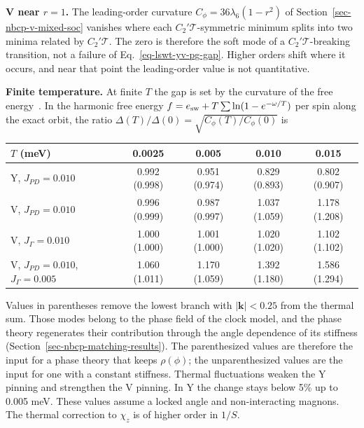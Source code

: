 \textbf{V near \(r=1\).} The leading-order curvature
\(C_\phi=36\lambda_6(1-r^2)\) of Section~\ref{sec-nbcp-v-mixed-soc}
vanishes where each \(C_2'\mathcal T\)-symmetric minimum splits into two
minima related by \(C_2'\mathcal T\). The zero is therefore the soft mode
of a \(C_2'\mathcal T\)-breaking transition, not a failure of
Eq.~\eqref{eq-lswt-yv-pg-gap}. Higher orders shift where it occurs, and
near that point the leading-order value is not quantitative.

\textbf{Finite temperature.} At finite \(T\) the gap is set by the
curvature of the free energy~\cite{lin2025}. In the harmonic free energy
\(f=e_{\rm sw}+T\sum\ln(1-e^{-\omega/T})\) per spin along the exact
orbit, the ratio \(\Delta(T)/\Delta(0)=\sqrt{C_\phi(T)/C_\phi(0)}\) is
\begin{center}
\small
\begin{tabular}{@{}lcccc@{}}
\toprule
\(T\) (meV) & 0.0025 & 0.005 & 0.010 & 0.015\\
\midrule
Y, \(J_{PD}=0.010\) & 0.992 (0.998) & 0.951 (0.974) & 0.829 (0.893) & 0.802 (0.907)\\
V, \(J_{PD}=0.010\) & 0.996 (0.999) & 0.987 (0.997) & 1.037 (1.059) & 1.178 (1.208)\\
V, \(J_\Gamma=0.010\) & 1.000 (1.000) & 1.001 (1.000) & 1.020 (1.020) & 1.102 (1.102)\\
V, \(J_{PD}=0.010\), \(J_\Gamma=0.005\) & 1.060 (1.011) & 1.170 (1.059) & 1.392 (1.180) & 1.586 (1.294)\\
\bottomrule
\end{tabular}
\end{center}
Values in parentheses remove the lowest branch with
\(|\mathbf k|<0.25\) from the thermal sum. Those modes belong to the
phase field of the clock model, and the phase theory regenerates their
contribution through the angle dependence of its stiffness
(Section~\ref{sec-nbcp-matching-results}). The parenthesized values are
therefore the input for a phase theory that keeps \(\rho(\phi)\); the
unparenthesized values are the input for one with a constant stiffness.
Thermal fluctuations weaken the Y pinning and strengthen the V pinning.
In Y the change stays below 5\% up to 0.005 meV. These values assume a
locked angle and non-interacting magnons. The thermal correction to
\(\chi_z\) is of higher order in \(1/S\).

